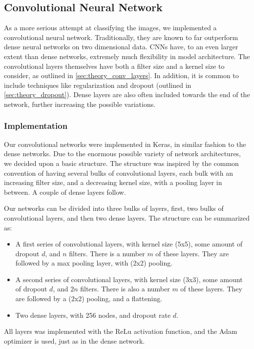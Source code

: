 \documentclass[10pt, twocolumn]{article}
\begin{document}
\subsection{Convolutional Neural Network}
As a more serious attempt at classifying the images, we implemented a convolutional neural network. Traditionally, they are known to far outperform dense neural networks on two dimensional data. CNNs have, to an even larger extent than dense networks, extremely much flexibility in model architecture. The convolutional layers themselves have both a filter size and a kernel size to consider, as outlined in \cref{sec:theory_conv_layers}. In addition, it is common to include techniques like regularization and dropout (outlined in \cref{sec:theory_dropout}). Dense layers are also often included towards the end of the network, further increasing the possible variations.

\subsubsection{Implementation}
Our convolutional networks were implemented in Keras, in similar fashion to the dense networks. Due to the enormous possible variety of network architectures, we decided upon a basic structure. The structure was inspired by the common convention of having several bulks of convolutional layers, each bulk with an increasing filter size, and a decreasing kernel size, with a pooling layer in between. A couple of dense layers follow.

Our networks can be divided into three bulks of layers, first, two bulks of  convolutional layers, and then two dense layers. The structure can be summarized as:

\begin{itemize}
    \item A first series of convolutional layers, with kernel size (5x5), some amount of dropout $d$, and $n$ filters. There is a number $m$ of these layers. They are followed by a max pooling layer, with (2x2) pooling.
    \item A second series of convolutional layers, with kernel size (3x3), some amount of dropout $d$, and $2n$ filters. There is also a number $m$ of these layers. They are followed by a (2x2) pooling, and a flattening.
    \item Two dense layers, with 256 nodes, and dropout rate $d$.
\end{itemize}

All layers was implemented with the ReLu activation function, and the Adam optimizer is used, just as in the dense network.
\end{document}
